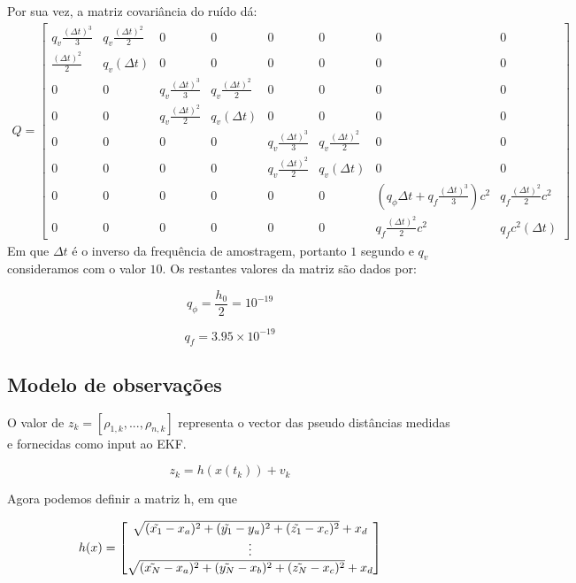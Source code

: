 \documentclass[palatino]{ist-report}
\begin{document}
Por sua vez, a matriz covariância do ruído dá:
\begin{align}
Q
= \begin{bmatrix}
q_v \frac{(\Delta t)^3}{3} & q_v \frac{(\Delta t)^2}{2}  & 0 & 0 & 0 & 0 & 0 & 0 \\
\frac{(\Delta t)^2}{2} & q_v (\Delta t) & 0 & 0 & 0 & 0 & 0 & 0 \\
0 & 0 & q_v \frac{(\Delta t)^3}{3} & q_v \frac{(\Delta t)^2}{2} & 0 & 0 & 0 & 0 \\
0 & 0 & q_v \frac{(\Delta t)^2}{2} & q_v (\Delta t)  & 0 & 0 & 0 & 0 \\
0 & 0 & 0 & 0 & q_v\frac{(\Delta t)^3}{3} & q_v\frac{(\Delta t)^2}{2} & 0 & 0 \\
0 & 0 & 0 & 0 & q_v\frac{(\Delta t)^2}{2} & q_v (\Delta t) & 0 & 0 \\
0 & 0 & 0 & 0 & 0 & 0 & (q_{\phi}\Delta t + q_f \frac{(\Delta t)^3 }{3})c^2 & q_f \frac{(\Delta t)^2}{2} c^2 \\
0 & 0 & 0 & 0 & 0 & 0 & q_f \frac{(\Delta t)^2}{2}c^2 & q_f c^2 (\Delta t)
\end{bmatrix} 
\end{align}
Em que $\Delta t$ é o inverso da frequência de amostragem, portanto $1$ segundo e $q_v$ consideramos com o valor $10$. Os restantes valores da matriz são dados por:

\begin{equation*}
    q_{\phi} = \frac{h_0}{2} = 10^{-19}
\end{equation*}
  
\begin{equation*}
      q_f = 3.95 \times 10^{-19}
\end{equation*}

\subsection{Modelo de observações}

O valor de $z_k=[\rho_{1,k},...,\rho_{n,k}]$ representa o vector das pseudo distâncias medidas e fornecidas como input ao EKF. 


\begin{equation*}
    z_k = h(x(t_k))+v_k
\end{equation*}


Agora podemos definir a matriz h, em que 


\begin{gather*}
    h(x) = \left[\begin{matrix}
        \sqrt{(\Tilde{x_1} - x_a)^2 + (\Tilde{y_1}-y_u)^2 + (\Tilde{z_1} - x_c)^2} + x_d \\
        \vdots \\
       \sqrt{(\Tilde{x_N} - x_a)^2 + (\Tilde{y_N}-x_b)^2 + (\Tilde{z_N} - x_c)^2} + x_d
    \end{matrix}\right]
\end{gather*}
\end{document}
